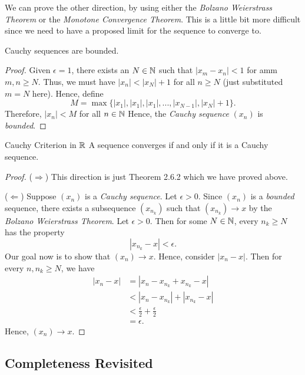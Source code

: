 We can prove the other direction, by using either the \textit{Bolzano Weierstrass Theorem} or the \textit{Monotone Convergence Theorem}. This is a little bit more difficult since we need to have a proposed limit for the sequence to converge to.  
\begin{lemma}{}{}
Cauchy sequences are bounded.
\end{lemma}

\begin{proof}
    Given \( \epsilon = 1\), there exists an \( N \in \mathbb{N} \) such that \( |x_m - x_n | < 1 \) for amm \( m,n \geq N \). Thus, we must have \( |x_n| < |x_{N}| + 1 \) for all \( n \geq N \) (just substituted \(m = N \) here). Hence, define 
    \[ M = \max \{ |x_1|, |x_1|, |x_1|,..., |x_{N-1}|, |x_{N}| + 1 \}.\]
   Therefore, \( |x_n| < M \) for all \( n \in \mathbb{N} \) Hence, the \textit{Cauchy sequence} \((x_n)\) is \textit{bounded}.
\end{proof}

\begin{theorem}{Cauchy Criterion in \( \mathbb{R}  \)}{}
A sequence converges if and only if it is a Cauchy sequence.
\end{theorem}

\begin{proof}
    (\(\Rightarrow\)) This direction is just Theorem 2.6.2 which we have proved above. 

    (\( \Leftarrow\)) Suppose \((x_n)\) is a \textit{Cauchy sequence}. Let \( \epsilon > 0 \). Since \( (x_n)\) is a \textit{bounded} sequence, there exists a subsequence \((x_{n_k})\) such that \((x_{n_k}) \to x \) by the \textit{Bolzano Weierstrass Theorem}. Let \( \epsilon > 0 \). Then for some \( N \in \mathbb{N} \), every \( n_k \geq N \) has the property
    \[ |x_{n_k} - x| < \epsilon.\]
Our goal now is to show that \( (x_n) \to x\). Hence, consider \( |x_n - x| \). Then for every \(n, n_{k} \geq N \), we have 
\begin{align*}
    |x_n - x | &= |x_n - x_{n_k} + x_{n_k} - x | \\
     &< |x_n - x_{n_k}| + |x_{n_k} - x| \\
     &< \frac{\epsilon}{2} + \frac{\epsilon}{2} \\
     &= \epsilon.
\end{align*}
Hence, \((x_n) \to x \).  
\end{proof}

\subsection{Completeness Revisited}

